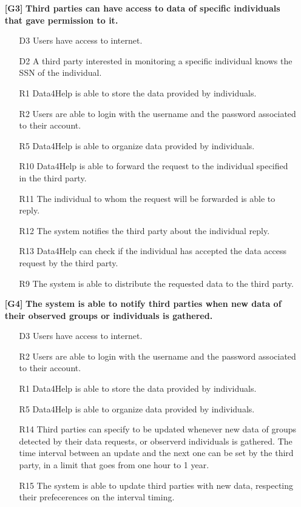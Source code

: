 \begin{enumerate}
\begin{enumerate}
\end{enumerate}

\item[\textbf{[G3]}] \textbf{Third parties can have access to data of specific individuals that gave permission to it.}

\begin{enumerate}

\item[D3] Users have access to internet.
\item[D2] A third party interested in monitoring a specific individual knows the SSN of the individual.
\item[R1] Data4Help is able to store the data provided by individuals.
\item[R2] Users are able to login with the username and the password associated to their account.
\item[R5] Data4Help is able to organize data provided by individuals.
\item[R10] Data4Help is able to forward the request to the individual specified in the third party.
\item[R11] The individual to whom the request will be forwarded is able to reply.
\item[R12] The system notifies the third party about the individual reply.
\item[R13] Data4Help can check if the individual has accepted the data access request by the third party.
\item[R9] The system is able to distribute the requested data to the third party.


\end{enumerate}

\item[\textbf{[G4]}] \textbf{The system is able to notify third parties when new data of their observed groups or individuals is gathered.}

\begin{enumerate}
\item[D3] Users have access to internet.
\item[R2] Users are able to login with the username and the password associated to their account.
\item[R1] Data4Help is able to store the data provided by individuals.
\item[R5] Data4Help is able to organize data provided by individuals.
\item[R14] Third parties can specify to be updated whenever new data of groups detected by their data requests, or observerd individuals is gathered. The time interval between an update and the next one can be set by the third party, in a limit that goes from one hour to 1 year.
\item[R15] The system is able to update third parties with new data, respecting their prefecerences on the interval timing.
\end{enumerate}


\end{enumerate}
